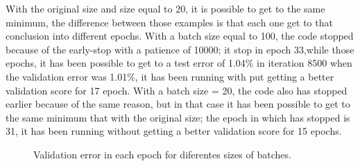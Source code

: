 With the original size and size equal to 20, it is possible to get to the same minimum, the difference between those examples is that each one get to that conclusion into different epochs. With a batch size equal to 100, the code stopped because of the early-stop with a patience of 10000; it stop in epoch 33,while those epochs, it has been possible to get to a test error of 1.04\% in iteration 8500 when the validation error was 1.01\%, it has been running with put getting a better validation score for 17 epoch. With a batch size = 20, the code also has stopped earlier because of the same reason, but in that case it has been possible to get to the same minimum that with the original size; the epoch in which has stopped is 31, it has been running without getting a better validation score for 15 epochs.\\

\begin{figure}[htb]
    \centering
        
    \caption{Validation error in each epoch for diferentes sizes of batches.} \label{figures:LENET-batches}
\end{figure}

